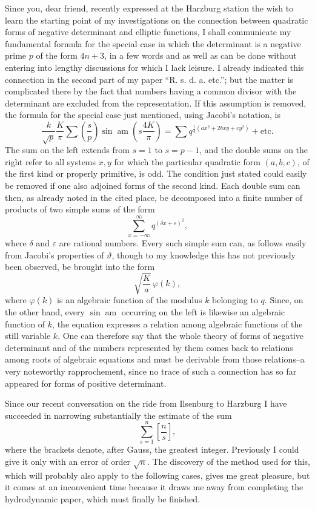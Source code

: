 \documentclass[11pt]{article}
\begin{document}
Since you, dear friend, recently expressed at the Harzburg station the wish to learn the starting point of my investigations on the connection between quadratic forms of negative determinant and elliptic functions, I shall communicate my fundamental formula for the special case in which the determinant is a negative prime $p$ of the form $4n+3$, in a few words and as well as can be done without entering into lengthy discussions for which I lack leisure. I already indicated this connection in the second part of my paper ``R. s. d. a. etc.''; but the matter is complicated there by the fact that numbers having a common divisor with the determinant are excluded from the representation. If this assumption is removed, the formula for the special case just mentioned, using Jacobi's notation, is
\[
  \frac{k}{\sqrt{p}}\frac{K}{\pi}
  \sum \left(\frac{s}{p}\right)
  \sin\operatorname{am}\!\left(s\frac{4K}{\pi}\right)
  =
  \sum q^{\frac14(ax^2+2bxy+cy^2)}+\text{etc.}
\]
The sum on the left extends from $s=1$ to $s=p-1$, and the double sums on the right refer to all systems $x,y$ for which the particular quadratic form $(a,b,c)$, of the first kind or properly primitive, is odd. The condition just stated could easily be removed if one also adjoined forms of the second kind. Each double sum can then, as already noted in the cited place, be decomposed into a finite number of products of two simple sums of the form
\[
  \sum_{x=-\infty}^{\infty}q^{(\delta x+\varepsilon)^2},
\]
where $\delta$ and $\varepsilon$ are rational numbers. Every such simple sum can, as follows easily from Jacobi's properties of $\vartheta$, though to my knowledge this has not previously been observed, be brought into the form
\[
  \sqrt{\frac{K}{a}}\,\varphi(k),
\]
where $\varphi(k)$ is an algebraic function of the modulus $k$ belonging to $q$. Since, on the other hand, every $\sin\operatorname{am}$ occurring on the left is likewise an algebraic function of $k$, the equation expresses a relation among algebraic functions of the still variable $k$. One can therefore say that the whole theory of forms of negative determinant and of the numbers represented by them comes back to relations among roots of algebraic equations and must be derivable from those relations--a very noteworthy rapprochement, since no trace of such a connection has so far appeared for forms of positive determinant.

Since our recent conversation on the ride from Ilsenburg to Harzburg I have succeeded in narrowing substantially the estimate of the sum
\[
  \sum_{s=1}^{n}\left[\frac{n}{s}\right],
\]
where the brackets denote, after Gauss, the greatest integer. Previously I could give it only with an error of order $\sqrt n$. The discovery of the method used for this, which will probably also apply to the following cases, gives me great pleasure, but it comes at an inconvenient time because it draws me away from completing the hydrodynamic paper, which must finally be finished.
\end{document}
